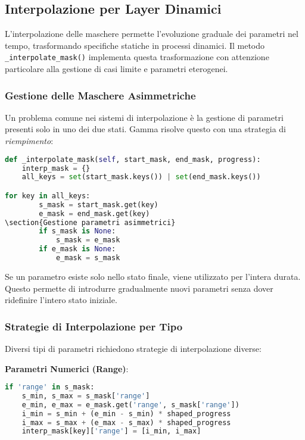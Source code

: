 \subsection{Interpolazione per Layer Dinamici}
L'interpolazione delle maschere permette l'evoluzione graduale dei parametri nel tempo, trasformando specifiche statiche in processi dinamici. Il metodo \texttt{\_interpolate\_mask()} implementa questa trasformazione con attenzione particolare alla gestione di casi limite e parametri eterogenei.
\subsubsection{Gestione delle Maschere Asimmetriche}
Un problema comune nei sistemi di interpolazione è la gestione di parametri presenti solo in uno dei due stati. Gamma risolve questo con una strategia di \textit{riempimento}:

\begin{lstlisting}[language=Python]
def _interpolate_mask(self, start_mask, end_mask, progress):
    interp_mask = {}
    all_keys = set(start_mask.keys()) | set(end_mask.keys())

for key in all_keys:
        s_mask = start_mask.get(key)
        e_mask = end_mask.get(key)
\section{Gestione parametri asimmetrici}
        if s_mask is None:
            s_mask = e_mask
        if e_mask is None:
            e_mask = s_mask
\end{lstlisting}

Se un parametro esiste solo nello stato finale, viene utilizzato per l'intera durata. Questo permette di introdurre gradualmente nuovi parametri senza dover ridefinire l'intero stato iniziale.
\subsubsection{Strategie di Interpolazione per Tipo}
Diversi tipi di parametri richiedono strategie di interpolazione diverse:

\textbf{Parametri Numerici (Range)}:
\begin{lstlisting}[language=Python]
if 'range' in s_mask:
    s_min, s_max = s_mask['range']
    e_min, e_max = e_mask.get('range', s_mask['range'])
    i_min = s_min + (e_min - s_min) * shaped_progress
    i_max = s_max + (e_max - s_max) * shaped_progress
    interp_mask[key]['range'] = [i_min, i_max]
\end{lstlisting}

